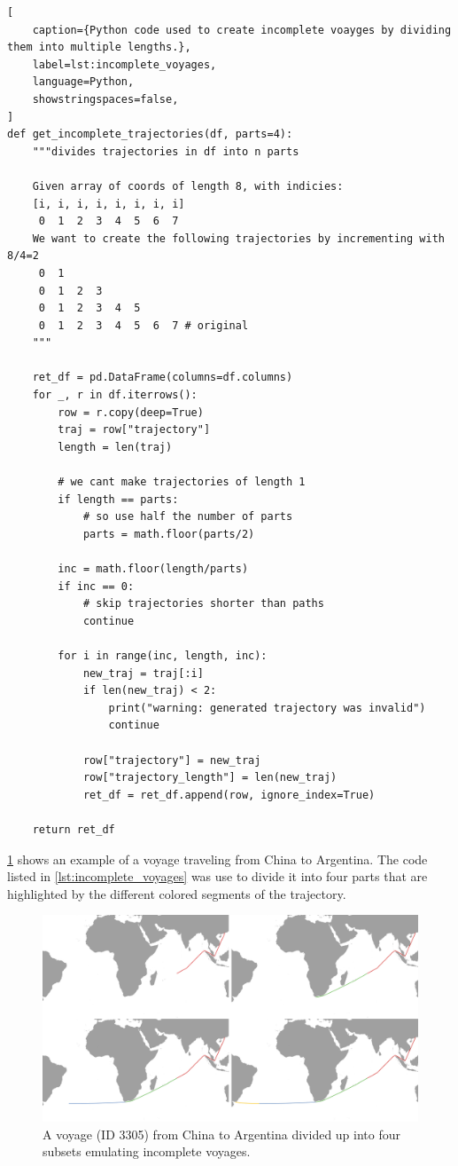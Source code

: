 \begin{lstlisting}[
    caption={Python code used to create incomplete voayges by dividing them into multiple lengths.},
    label=lst:incomplete_voyages,
    language=Python,
    showstringspaces=false,
]
def get_incomplete_trajectories(df, parts=4):
    """divides trajectories in df into n parts

    Given array of coords of length 8, with indicies:
    [i, i, i, i, i, i, i, i]
     0  1  2  3  4  5  6  7
    We want to create the following trajectories by incrementing with 8/4=2
     0  1
     0  1  2  3
     0  1  2  3  4  5
     0  1  2  3  4  5  6  7 # original
    """

    ret_df = pd.DataFrame(columns=df.columns)
    for _, r in df.iterrows():
        row = r.copy(deep=True)
        traj = row["trajectory"]
        length = len(traj)

        # we cant make trajectories of length 1
        if length == parts:
            # so use half the number of parts
            parts = math.floor(parts/2)

        inc = math.floor(length/parts)
        if inc == 0:
            # skip trajectories shorter than paths
            continue

        for i in range(inc, length, inc):
            new_traj = traj[:i]
            if len(new_traj) < 2:
                print("warning: generated trajectory was invalid")
                continue

            row["trajectory"] = new_traj
            row["trajectory_length"] = len(new_traj)
            ret_df = ret_df.append(row, ignore_index=True)

    return ret_df
\end{lstlisting}


\cref{fig:incomplete_voyage} shows an example of a voyage traveling from China to Argentina. The code listed in \cref{lst:incomplete_voyages} was use to divide it into four parts that are highlighted by the different colored segments of the trajectory.

\noindent
\begin{figure}[htbp]
    \includegraphics[width=1.0\textwidth]{figures/incomplete_voyage}
    \caption{A voyage (ID 3305) from China to Argentina divided up into four subsets emulating incomplete voyages.}
    \label{fig:incomplete_voyage}
\end{figure}

